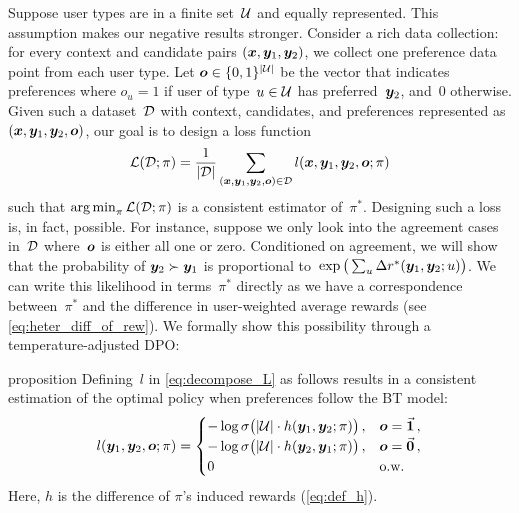Suppose user types are in a finite set~${\mathcal{U}}$ and equally represented. This assumption makes our negative results stronger. Consider a rich data collection: for every context and candidate pairs $({\bm{x}}, {\bm{y}}_1, {\bm{y}}_2)$, we collect one preference data point from each user type. Let ${\bm{o}} \in \{0,1\}^{|{\mathcal{U}}|}$ be the vector that indicates preferences where $o_{u} = 1$ if user of type~$u \in {\mathcal{U}}$ has preferred~${\bm{y}}_2$, and~$0$ otherwise.
Given such a dataset~${\mathcal{D}}$ with context, candidates, and preferences represented as $({\bm{x}}, {\bm{y}}_1, {\bm{y}}_2, {\bm{o}})$, our goal is to design a loss function
%
\begin{equation}
\label{eq:decompose_L}
    {\mathcal{L}}({\mathcal{D}}; \pi) = \frac{1}{|{\mathcal{D}}|} \sum_{({\bm{x}}, {\bm{y}}_1, {\bm{y}}_2, {\bm{o}}) \in {\mathcal{D}}} l({\bm{x}}, {\bm{y}}_1, {\bm{y}}_2, {\bm{o}}; \pi)
\end{equation}
%
such that $\operatorname*{arg\,min}_\pi {\mathcal{L}}({\mathcal{D}}; \pi)$ is a consistent estimator of~$\pi^*$. 
Designing such a loss is, in fact, possible. For instance, suppose we only look into the agreement cases in~${\mathcal{D}}$ where~${\bm{o}}$ is either all one or zero. Conditioned on agreement, we will show that the probability of ${\bm{y}}_2 \succ {\bm{y}}_1$ is proportional to~$\exp\big(\sum_u \Delta r^*({\bm{y}}_1, {\bm{y}}_2; u)\big)$. We can write this likelihood in terms~$\pi^*$ directly as we have a correspondence between~$\pi^*$ and the difference in user-weighted average rewards (see \cref{eq:heter_diff_of_rew}). We formally show this possibility through a temperature-adjusted DPO:
\begin{theoremEnd}[restate]{proposition}
\label{prop:consistent_loss_1}
Defining~$l$ in \cref{eq:decompose_L} as follows results in a consistent estimation of the optimal policy when preferences follow the BT model:
%
\begin{equation*}
    l({\bm{y}}_1, {\bm{y}}_2, {\bm{o}}; \pi) = \begin{cases}
        -\log \sigma\big( |{\mathcal{U}}| \cdot h({\bm{y}}_1, {\bm{y}}_2; \pi) \big) \,, & {\bm{o}} = \vec{{\bm{1}}} \,, \\
        -\log \sigma \big( |{\mathcal{U}}| \cdot h({\bm{y}}_2, {\bm{y}}_1; \pi) \big) \,, & {\bm{o}} = \vec{{\bm{0}}} \,, \\
        0 & \text{o.w.}
    \end{cases}
\end{equation*}
%
Here, $h$ is the difference of $\pi$'s induced rewards (\cref{eq:def_h}).
\end{theoremEnd}

